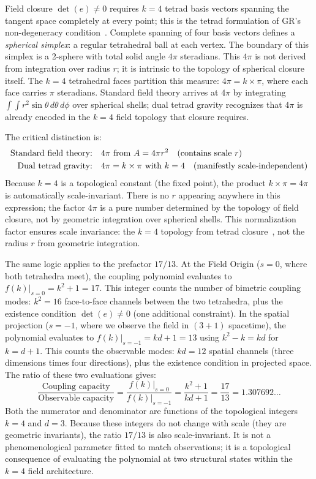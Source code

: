 \documentclass[aps,prd,preprint,superscriptaddress,showpacs,preprintnumbers,amsmath,amssymb,nofootinbib]{revtex4-2}
\begin{document}
Field closure $\det(e) \neq 0$ requires $k=4$ tetrad basis vectors spanning the tangent space completely at every point; this is the tetrad formulation of GR's non-degeneracy condition~\cite{mtw1973,wald1984}. Complete spanning of four basis vectors defines a \emph{spherical simplex}: a regular tetrahedral ball at each vertex. The boundary of this simplex is a 2-sphere with total solid angle $4\pi$ steradians. This $4\pi$ is not derived from integration over radius $r$; it is intrinsic to the topology of spherical closure itself. The $k=4$ tetrahedral faces partition this measure: $4\pi = k \times \pi$, where each face carries $\pi$ steradians. Standard field theory arrives at $4\pi$ by integrating $\int\int r^2 \sin\theta\,d\theta\,d\phi$ over spherical shells; dual tetrad gravity recognizes that $4\pi$ is already encoded in the $k=4$ field topology that closure requires.

The critical distinction is:
\begin{align}
\text{Standard field theory:} \quad & 4\pi \text{ from } A = 4\pi r^2 \quad \text{(contains scale } r\text{)} \notag \\
\text{Dual tetrad gravity:} \quad & 4\pi = k \times \pi \text{ with } k=4 \quad \text{(manifestly scale-independent)}
\label{eq:4pi-distinction}
\end{align}
Because $k=4$ is a topological constant (the fixed point), the product $k\times\pi = 4\pi$ is automatically scale-invariant. There is no $r$ appearing anywhere in this expression; the factor $4\pi$ is a pure number determined by the topology of field closure, not by geometric integration over spherical shells. This normalization factor ensures scale invariance: the $k=4$ topology from tetrad closure~\cite{mtw1973,wald1984}, not the radius $r$ from geometric integration.

The same logic applies to the prefactor $17/13$. At the Field Origin ($s=0$, where both tetrahedra meet), the coupling polynomial evaluates to $f(k)|_{s=0} = k^2 + 1 = 17$. This integer counts the number of bimetric coupling modes: $k^2 = 16$ face-to-face channels between the two tetrahedra, plus the existence condition $\det(e) \neq 0$ (one additional constraint). In the spatial projection ($s=-1$, where we observe the field in $(3+1)$ spacetime), the polynomial evaluates to $f(k)|_{s=-1} = kd+1 = 13$ using $k^2 - k = kd$ for $k = d+1$. This counts the observable modes: $kd = 12$ spatial channels (three dimensions times four directions), plus the existence condition in projected space. The ratio of these two evaluations gives:
\begin{equation}
\frac{\text{Coupling capacity}}{\text{Observable capacity}}
= \frac{f(k)|_{s=0}}{f(k)|_{s=-1}}
= \frac{k^2+1}{kd+1}
= \frac{17}{13}
= 1.307692\ldots
\label{eq:coupling-ratio}
\end{equation}
Both the numerator and denominator are functions of the topological integers $k=4$ and $d=3$. Because these integers do not change with scale (they are geometric invariants), the ratio $17/13$ is also scale-invariant. It is not a phenomenological parameter fitted to match observations; it is a topological consequence of evaluating the polynomial at two structural states within the $k=4$ field architecture.
\end{document}

